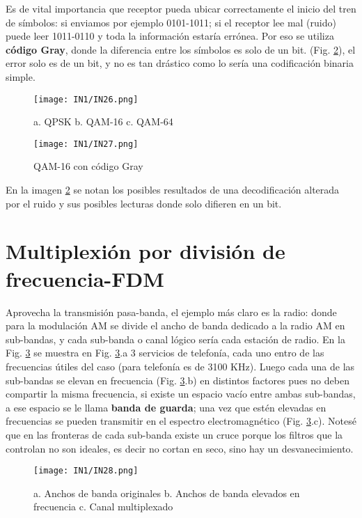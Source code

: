 \documentclass[
	12pt, %
	fleqn, %
	a4paper, %
	oneside, %
]{LegrandOrangeBook}
\begin{document}
Es de vital importancia que receptor pueda ubicar correctamente el inicio del tren de símbolos: si enviamos por ejemplo 0101-1011; si el receptor lee mal (ruido) puede leer 1011-0110 y toda la información estaría errónea. Por eso se utiliza \textbf{código Gray}, donde la diferencia entre los símbolos es solo de un bit. (Fig. \ref{fig: qam gray}), el error solo es de un bit, y no es tan drástico como lo sería una codificación binaria simple.
\begin{figure}[]
\centering
\texttt{[image: IN1/IN26.png]}
\caption{a. QPSK b. QAM-16 c. QAM-64}
\label{fig: diagrama de constelación}
\end{figure}
\begin{figure}[]
\centering
\texttt{[image: IN1/IN27.png]}
\caption{QAM-16 con código Gray}
\label{fig: qam gray}
\end{figure}
En la imagen \ref{fig: qam gray} se notan los posibles resultados de una decodificación alterada por el ruido y sus posibles lecturas donde solo difieren en un bit.
\section{Multiplexión por división de frecuencia-FDM}
Aprovecha la transmisión pasa-banda, el ejemplo más claro es la radio: donde para la modulación AM se divide el ancho de banda dedicado a la radio AM en sub-bandas, y cada sub-banda o canal lógico sería cada estación de radio. En la Fig. \ref{fig: fdm mul} se muestra en Fig. \ref{fig: fdm mul}.a 3 servicios de telefonía, cada uno entro de las frecuencias útiles del caso (para telefonía es de 3100 KHz). Luego cada una de las sub-bandas se elevan en frecuencia (Fig. \ref{fig: fdm mul}.b) en distintos factores pues no deben compartir la misma frecuencia, si existe un espacio vacío entre ambas sub-bandas, a ese espacio se le llama \textbf{banda de guarda}; una vez que estén elevadas en frecuencias se pueden transmitir en el espectro electromagnético (Fig. \ref{fig: fdm mul}.c). Notesé que en las fronteras de cada sub-banda existe un cruce porque los filtros que la controlan no son ideales, es decir no cortan en seco, sino hay un desvanecimiento.
\begin{figure}[]
\centering
\texttt{[image: IN1/IN28.png]}
\caption{a. Anchos de banda originales b. Anchos de banda elevados en frecuencia c. Canal multiplexado}
\label{fig: fdm mul}
\end{figure}
\end{document}
